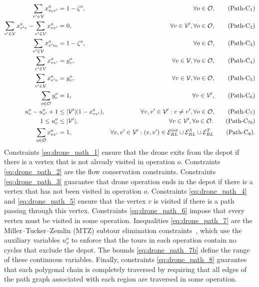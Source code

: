 \documentclass[12pt]{elsarticle}
\begin{document}
\begin{align*}
\sum_{v'\in \mathcal V} x_{v_0v'}^{o}&=1-\zeta^o,&\quad \forall o\in\mathcal O,\label{eq:drone_path_1}\tag{Path-C$_1$}\\
\sum_{v'\in\mathcal V} x_{v'v}^{o}-\sum_{v'\in\mathcal V}x_{vv'}^{o}&=0,&\quad\forall v\in\mathcal V',\forall o\in\mathcal O,\label{eq:drone_path_2}\tag{Path-C$_2$}\\
\sum_{v'\in\mathcal V} x_{v'v_0}^{o}&=1-\zeta^o,&\quad\forall o\in\mathcal O,\label{eq:drone_path_3}\tag{Path-C$_3$}\\
\sum_{v'\in\mathcal V} x_{vv'}^o&=y_{v}^o,&\quad\forall v\in\mathcal V,\forall o\in\mathcal O,\label{eq:drone_path_4}\tag{Path-C$_4$}\\
\sum_{v'\in\mathcal V} x_{v'v}^o&=y_{v}^o,&\quad\forall v\in\mathcal V,\forall o\in\mathcal O,\label{eq:drone_path_5}\tag{Path-C$_5$}\\
\sum_{o\in\mathcal O}y_v^o&=1,&\quad\forall v\in\mathcal V',\label{eq:drone_path_6}\tag{Path-C$_6$}\\
u_v^o - u_{v'}^o + 1 &\leq |\mathcal V'|(1 - x_{vv'}^o), &\quad\forall v,v'\in\mathcal V':v\neq v',\forall o\in\mathcal O,\label{eq:drone_path_7}\tag{Path-C$_7$}\\
1 \leq u_v^o &\leq |\mathcal V'|, &\quad\forall v\in\mathcal V',\forall o\in\mathcal O.\label{eq:drone_path_7b}\tag{Path-C$_{7b}$}\\
\sum_{o\in\mathcal O} x_{vv'}^o &= 1, &\forall v,v'\in\mathcal V':(v,v')\in\mathcal E_{RL}^{int}\cup\mathcal E_{RL}^{S}\cup\mathcal E_{RL}^{T}\label{eq:drone_path_8}\tag{Path-C$_8$}.
\end{align*}
Constraints \eqref{eq:drone_path_1} ensure that the drone exits from the depot if there is a vertex that is not already visited in operation $o$. Constraints \eqref{eq:drone_path_2} are the flow conservation constraints. Constraints \eqref{eq:drone_path_3} guarantee that drone operation ends in the depot if there is a vertex that has not been visited in operation $o$. Constraints \eqref{eq:drone_path_4} and \eqref{eq:drone_path_5} ensure that the vertex $v$ is visited if there is a path passing through this vertex. Constraints \eqref{eq:drone_path_6} impose that every vertex must be visited in some operation. Inequalities \eqref{eq:drone_path_7} are the Miller--Tucker--Zemlin (MTZ) subtour elimination constraints~\cite{MTZ1960}, which use the auxiliary variables $u_v^o$ to enforce that the tours in each operation contain no cycles that exclude the depot. The bounds \eqref{eq:drone_path_7b} define the range of these continuous variables. Finally, constraints \eqref{eq:drone_path_8}
guarantee that each polygonal chain is completely traversed by requiring that all edges of the path graph associated with each region are traversed in some operation.
\end{document}
